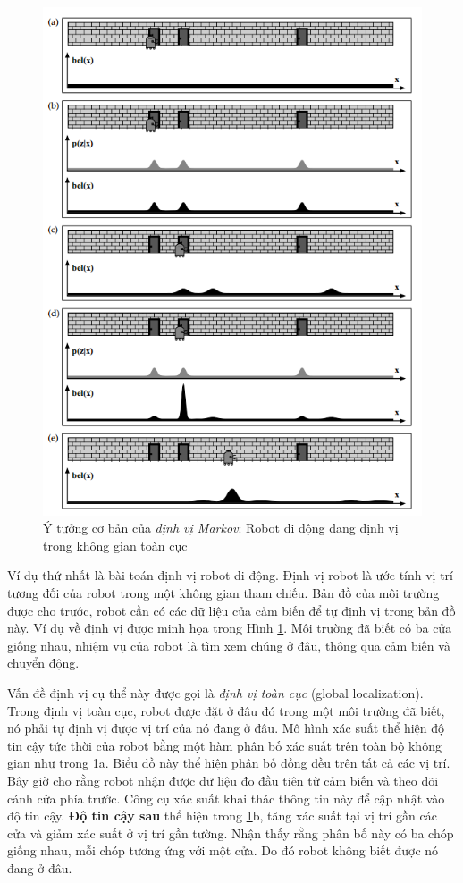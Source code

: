 \begin{figure}[htbp]
  \centering
  \includegraphics[width=0.8\linewidth]{figures/markovLocalization.png}
  \caption{Ý tưởng cơ bản của \textit{định vị Markov}: Robot di động đang định vị trong không gian toàn cục \cite{thrun2005probabilistic}}
  \label{fig:markovLocalization}
\end{figure}

Ví dụ thứ nhất là bài toán định vị robot di động. Định vị robot là ước tính vị trí tương đối của robot trong một không gian tham chiếu. Bản đồ của môi trường được cho trước, robot cần có các dữ liệu của cảm biến để tự định vị trong bản đồ này. Ví dụ về định vị được minh họa trong Hình \ref{fig:markovLocalization}. Môi trường đã biết có ba cửa giống nhau, nhiệm vụ của robot là tìm xem chúng ở đâu, thông qua cảm biến và chuyển động.

Vấn đề định vị cụ thể này được gọi là \textit{định vị toàn cục} (global localization). Trong định vị toàn cục, robot được đặt ở đâu đó trong một môi trường đã biết, nó phải tự định vị được vị trí của nó đang ở đâu. Mô hình xác suất thể hiện độ tin cậy tức thời của robot bằng một hàm phân bố xác suất trên toàn bộ không gian như trong \figurename{ \ref{fig:markovLocalization}}a. Biểu đồ này thể hiện phân bố đồng đều trên tất cả các vị trí. Bây giờ cho rằng robot nhận được dữ liệu đo đầu tiên từ cảm biến và theo dõi cánh cửa phía trước. Công cụ xác suất khai thác thông tin này để cập nhật vào độ tin cậy.
\textbf{Độ tin cậy sau}
thể hiện trong \figurename{ \ref{fig:markovLocalization}}b, tăng xác suất tại vị trí gần các cửa và giảm xác suất ở vị trí gần tường.
Nhận thấy rằng phân bố này có ba chóp giống nhau, mỗi chóp tương ứng với một cửa. Do đó robot không biết được nó đang ở đâu.

